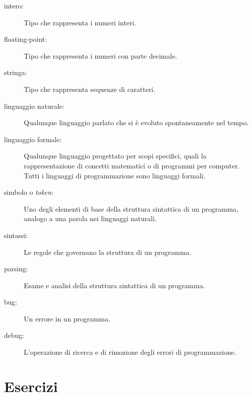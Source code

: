 \documentclass[10pt]{book}
\begin{document}
\begin{description}
\item[intero:] Tipo che rappresenta i numeri interi.

\item[floating-point:] Tipo che rappresenta i numeri con parte decimale.

\item[stringa:] Tipo che rappresenta sequenze di caratteri.

\item[linguaggio naturale:]  Qualunque linguaggio parlato che si è evoluto spontaneamente nel tempo.

\item[linguaggio formale:]  Qualunque linguaggio progettato per scopi specifici, quali la rappresentazione di concetti matematici o di programmi per computer. Tutti i linguaggi di programmazione sono linguaggi formali.

\item[simbolo o {\em token}:]  Uno degli elementi di base della struttura sintattica di un programma, analogo a una parola nei linguaggi naturali.

\item[sintassi:] Le regole che governano la struttura di un programma.

\item[parsing:] Esame e analisi della struttura sintattica di un programma.

\item[bug:] Un errore in un programma.

\item[debug:] L'operazione di ricerca e di rimozione degli errori di programmazione.


\end{description}


\section{Esercizi}
\end{document}
